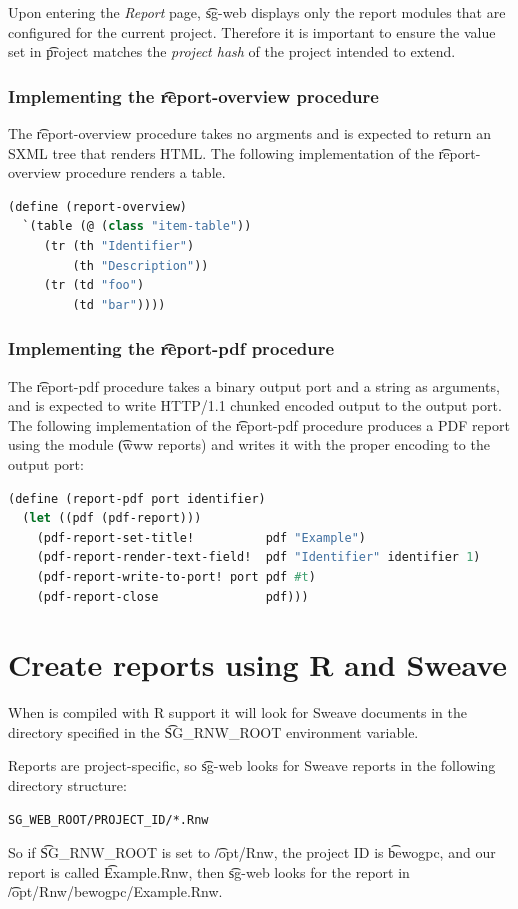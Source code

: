   Upon entering the \emph{Report} page, \t{sg-web} displays only the report
  modules that are configured for the current project.  Therefore it is
  important to ensure the value set in \t{project} matches the
  \emph{project hash} of the project intended to extend.

\subsubsection{Implementing the \t{report-overview} procedure}

  The \t{report-overview} procedure takes no argments and is expected to
  return an SXML tree that renders HTML.  The following implementation of
  the \t{report-overview} procedure renders a table.

\begin{lstlisting}[language=Lisp]
(define (report-overview)
  `(table (@ (class "item-table"))
     (tr (th "Identifier")
         (th "Description"))
     (tr (td "foo")
         (td "bar"))))
\end{lstlisting}

\subsubsection{Implementing the \t{report-pdf} procedure}

  The \t{report-pdf} procedure takes a binary output port and a string as
  arguments, and is expected to write HTTP/1.1 chunked encoded output to
  the output port.  The following implementation of the \t{report-pdf}
  procedure produces a PDF report using the module \t{(www reports)}
  and writes it with the proper encoding to the output port:

\begin{lstlisting}[language=Lisp]
(define (report-pdf port identifier)
  (let ((pdf (pdf-report)))
    (pdf-report-set-title!          pdf "Example")
    (pdf-report-render-text-field!  pdf "Identifier" identifier 1)
    (pdf-report-write-to-port! port pdf #t)
    (pdf-report-close               pdf)))
\end{lstlisting}

\pagebreak{}
\section{Create reports using R and Sweave}
\label{sec:sweave-reports}

  When  is compiled with R support it will look for
  Sweave documents in the directory specified in the \t{SG\_RNW\_ROOT}
  environment variable.

  Reports are project-specific, so \t{sg-web} looks for Sweave reports
  in the following directory structure:

\begin{lstlisting}
SG_WEB_ROOT/PROJECT_ID/*.Rnw
\end{lstlisting}

  So if \t{SG\_RNW\_ROOT} is set to \t{/opt/Rnw}, the project ID is
  \t{bewogpc}, and our report is called \t{Example.Rnw}, then \t{sg-web}
  looks for the report in \t{/opt/Rnw/bewogpc/Example.Rnw}.
